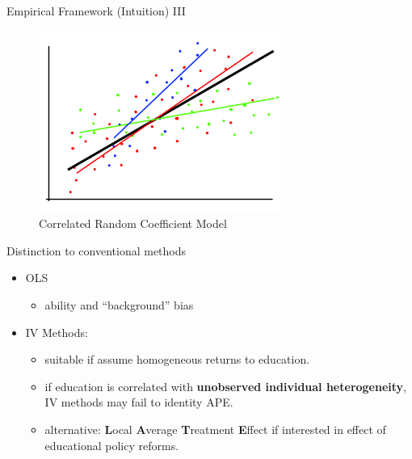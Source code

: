 \documentclass[10pt,ignorenonframetext,]{beamer}
\providecommand{\tightlist}{%
  \setlength{\itemsep}{0pt}\setlength{\parskip}{0pt}}
\begin{document}
\begin{frame}{Empirical Framework (Intuition) III}
\protect\hypertarget{empirical-framework-intuition-iii}{}

\begin{figure}
\centering
\includegraphics[width=3.125in,height=\textheight]{img/rcmodel003.png}
\caption{Correlated Random Coefficient Model}
\end{figure}

\end{frame}

\begin{frame}{Distinction to conventional methods}
\protect\hypertarget{distinction-to-conventional-methods}{}

\begin{itemize}
\item
  OLS

  \begin{itemize}
  \tightlist
  \item
    ability and ``background'' bias
  \end{itemize}
\item
  IV Methods:

  \begin{itemize}
  \tightlist
  \item
    suitable if assume homogeneous returns to education.
  \item
    if education is correlated with \textbf{unobserved individual
    heterogeneity}, IV methods may fail to identity APE.
  \item
    alternative: \textbf{L}ocal \textbf{A}verage \textbf{T}reatment
    \textbf{E}ffect if interested in effect of educational policy
    reforms.
  \end{itemize}
\end{itemize}

\end{frame}
\end{document}
